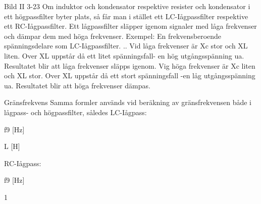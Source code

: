 Bild II 3-23
Om induktor och kondensator respektive
resister och kondensator i ett högpassfilter
byter plats, så får man i stället ett LC-Iågpassfilter respektive ett RC-Iågpassfilter.
Ett lågpassfilter släpper igenom signaler
med låga frekvenser och dämpar dem med
höga frekvenser.
Exempel: En frekvensberoende spänningsdelare som LC-Iågpassfilter.
.. Vid låga frekvenser är Xc stor och XL liten.
Over XL uppstår då ett litet spänningsfall- en
hög utgångsspänning ua. Resultatet blir att
låga frekvenser släpps igenom.
Vig höga frekvenser är Xc liten och XL
stor. Over XL uppstår då ett stort spänningsfall -en låg utgångsspänning ua. Resultatet
blir att höga frekvenser dämpas.

Gränsfrekvens
Samma formler används vid beräkning av
gränsfrekvensen både i lågpass- och högpassfilter, således
LC-Iågpass: ~

f9 [Hz]

L [H]

RC-Iågpass: ~

f9 [Hz]

1

